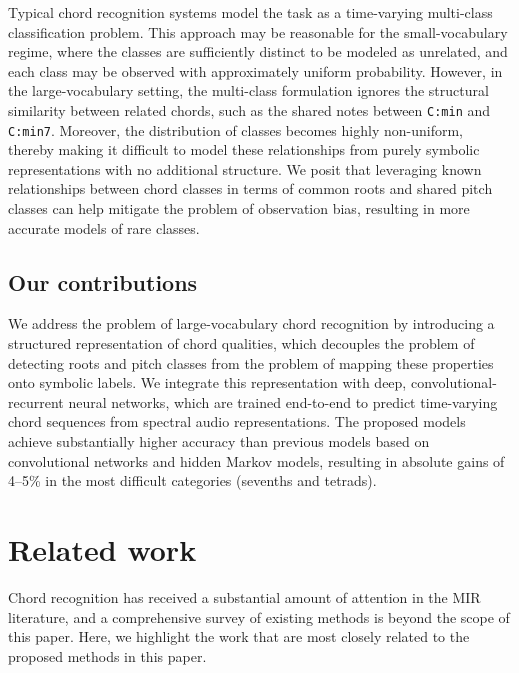 \documentclass{article}
\begin{document}
Typical chord recognition systems model the task as a time-varying multi-class classification problem.
This approach may be reasonable for the small-vocabulary regime, where the classes are sufficiently distinct to be modeled as unrelated, and each class may be observed with approximately uniform probability.
However, in the large-vocabulary setting, the multi-class formulation ignores the structural similarity between related chords, such as the shared notes between \texttt{C:min} and \texttt{C:min7}.
Moreover, the distribution of classes becomes highly non-uniform, thereby making it difficult to model these relationships from purely symbolic representations with no additional structure.
We posit that leveraging known relationships between chord classes in terms of common roots and shared pitch classes can help mitigate the problem of observation bias, resulting in more accurate models of rare classes.

\subsection{Our contributions}

We address the problem of large-vocabulary chord recognition by introducing a structured representation of chord qualities, which decouples the problem of detecting roots and pitch classes from the problem of mapping these properties onto symbolic labels.
We integrate this representation with deep, convolutional-recurrent neural networks, which are trained end-to-end to predict time-varying chord sequences from spectral audio representations.
The proposed models achieve substantially higher accuracy than previous models based on convolutional networks and hidden Markov models, resulting in absolute gains of 4--5\% in the most difficult categories (sevenths and tetrads).

%
\section{Related work}

Chord recognition has received a substantial amount of attention in the MIR literature, and a comprehensive survey of existing methods is beyond the scope of this paper.
Here, we highlight the work that are most closely related to the proposed methods in this paper.
\end{document}
